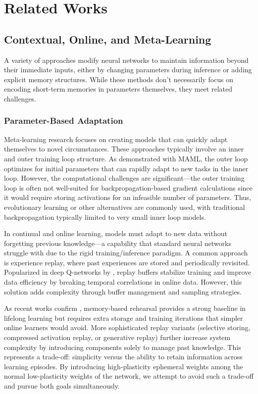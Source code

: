 \documentclass[conference]{IEEEtran}
\begin{document}
\section{Related Works}

\subsection{Contextual, Online, and Meta-Learning}

A variety of approaches modify neural networks to maintain information beyond their immediate inputs, either by changing parameters during inference or adding explicit memory structures. While these methods don't necessarily focus on encoding short-term memories in parameters themselves, they meet related challenges.

\subsubsection{Parameter-Based Adaptation}

Meta-learning research focuses on creating models that can quickly adapt themselves to novel circumstances. These approaches typically involve an inner and outer training loop structure. As \cite{finnModelagnosticMetalearningFast2017} demonstrated with MAML, the outer loop optimizes for initial parameters that can rapidly adapt to new tasks in the inner loop. However, the computational challenges are significant—the outer training loop is often not well-suited for backpropagation-based gradient calculations since it would require storing activations for an infeasible number of parameters. Thus, evolutionary learning or other alternatives are commonly used, with traditional backpropagation typically limited to very small inner loop models.

In continual and online learning, models must adapt to new data without forgetting previous knowledge—a capability that standard neural networks struggle with due to the rigid training/inference paradigm. A common approach is experience replay, where past experiences are stored and periodically revisited. Popularized in deep Q-networks by \cite{mnihHumanlevelControlDeep2015}, replay buffers stabilize training and improve data efficiency by breaking temporal correlations in online data. However, this solution adds complexity through buffer management and sampling strategies.

As recent works confirm \cite{Forgetting_Survey_2024}, memory-based rehearsal provides a strong baseline in lifelong learning but requires extra storage and training iterations that simpler online learners would avoid. More sophisticated replay variants (selective storing, compressed activation replay, or generative replay) further increase system complexity by introducing components solely to manage past knowledge. This represents a trade-off: simplicity versus the ability to retain information across learning episodes. By introducing high-plasticity ephemeral weights among the normal low-plasticity weights of the network, we attempt to avoid such a trade-off and pursue both goals simultaneously.
\end{document}
